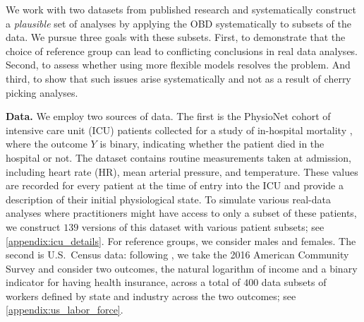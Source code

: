 We work with two datasets from published research and systematically construct a \textit{plausible} set of analyses by applying the OBD systematically to subsets of the data.
We pursue three goals with these subsets.
First, to demonstrate that the choice of reference group can lead to conflicting conclusions in real data analyses.
Second, to assess whether using more flexible models resolves the problem.
And third, to show that such issues arise systematically and not as a result of cherry picking analyses.




\textbf{Data.} We employ two sources of data. The first is the PhysioNet cohort %
 of intensive care unit (ICU) patients collected for a study of in-hospital mortality \citep{goldberger2000physiobank}, where the outcome $Y$ is binary, indicating whether the patient died in the hospital or not. The dataset contains routine measurements taken at admission, including heart rate (HR), mean arterial pressure, and temperature. These values are recorded for every patient at the time of entry into the ICU and provide a description of their initial physiological state. To simulate various real-data analyses where practitioners might have access to only a subset of these patients, we construct $139$ versions of this dataset with various patient subsets; see \cref{appendix:icu_details}.
For reference groups, we consider males and females.
The second is U.S.\ Census data: following \citet{bach2024heterogeneity}, we take the 2016 American Community Survey and consider two outcomes, the natural logarithm of income and a binary indicator for having health insurance, across a total of $400$ data subsets of workers defined by state and industry across the two outcomes; see \cref{appendix:us_labor_force}.

